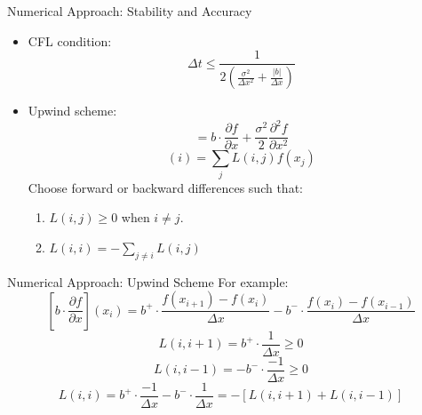 \documentclass{beamer}
\begin{document}
	\begin{frame}{Numerical Approach: Stability and Accuracy}
		\begin{itemize}
			\item CFL condition:
			\begin{equation} 
			\Delta t \leq \frac{1}{2(\frac{\sigma^2}{\Delta x^2}+\frac{|b|}{\Delta x})}
			\end{equation}
			\item Upwind scheme:
			\begin{equation}
			[Lf]=b \cdot \frac{\partial f}{\partial x} + \frac{\sigma^2}{2}\frac{\partial^2 f}{\partial x^2}
			\end{equation}
			\begin{equation}
			[Lf](i)=\sum_{j} L(i,j) f(x_j)
			\end{equation}
			Choose forward or backward differences such that:
			\begin{enumerate}
				\item $L(i,j)\geq 0$ when $i \neq j$.
				\item $L(i,i)=-\sum_{j\neq i} L(i,j)$
			\end{enumerate}
			
		\end{itemize}
	\end{frame}
	
	\begin{frame}{Numerical Approach: Upwind Scheme}
		For example:
		\begin{equation}
		\left[b \cdot \frac{\partial f}{\partial x} \right](x_i)=b^{+} \cdot \frac{f(x_{i+1})-f(x_i)}{\Delta x}-b^{-} \cdot \frac{f(x_{i})-f(x_{i-1})}{\Delta x}
		\end{equation}
		\begin{equation}
		L(i,i+1)=b^{+} \cdot \frac{1}{\Delta x} \geq 0
		\end{equation}
		\begin{equation}
		L(i,i-1)=-b^{-} \cdot \frac{-1}{\Delta x} \geq 0
		\end{equation}
		\begin{equation}
		L(i,i)=b^{+} \cdot \frac{-1}{\Delta x}-b^{-} \cdot \frac{1}{\Delta x} = -[L(i,i+1)+L(i,i-1)]
		\end{equation}
	\end{frame}
	
\end{document}
